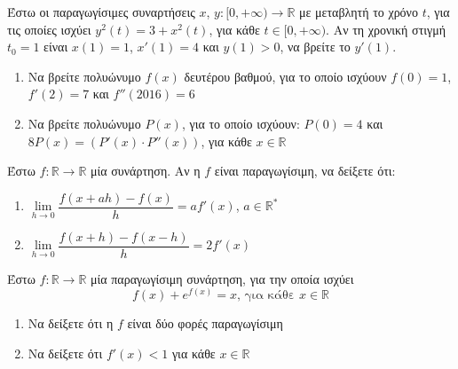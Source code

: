 \documentclass{presentation}
\begin{document}
\begin{askisi}
    Έστω οι παραγωγίσιμες συναρτήσεις $x$, $y:[0,+\infty)\to\mathbb{R}$ με μεταβλητή το χρόνο $t$, για τις οποίες ισχύει $y^2(t)=3+x^2(t)$, για κάθε $t\in [0,+\infty )$. Αν τη χρονική στιγμή $t_0=1$ είναι $x(1)=1$, $x'(1)=4$ και $y(1)>0$, να βρείτε το $y'(1)$.

\end{askisi}

\begin{askisi}
    \begin{enumerate}
        \item<1->  Να βρείτε πολυώνυμο $f(x)$ δευτέρου βαθμού, για το οποίο ισχύουν $f(0)=1$, $f'(2)=7$ και $f''(2016)=6$
        \item<2-> Να βρείτε πολυώνυμο $P(x)$, για το οποίο ισχύουν: $P(0)=4$ και $8P(x)=\left( P'(x)\cdot P''(x) \right) $, για κάθε $x\in\mathbb{R}$
    \end{enumerate}

\end{askisi}

\begin{askisi}
    Έστω $f:\mathbb{R}\to\mathbb{R}$ μία συνάρτηση. Αν η $f$ είναι παραγωγίσιμη, να δείξετε ότι:
    \begin{enumerate}
        \item<1-> $\lim\limits_{h \to 0}{ \dfrac{f(x+ah)-f(x)}{h} }=af'(x)$, $a\in\mathbb{R}^*$
        \item<2-> $\lim\limits_{h \to 0}{ \dfrac{f(x+h)-f(x-h)}{h} }=2f'(x)$
    \end{enumerate}

\end{askisi}

\begin{askisi}
    Έστω $f:\mathbb{R}\to\mathbb{R}$ μία παραγωγίσιμη συνάρτηση, για την οποία ισχύει
    $$f(x)+e^{f(x)}=x \text{, για κάθε } x\in\mathbb{R}$$
    \begin{enumerate}
        \item<1-> Να δείξετε ότι η $f$ είναι δύο φορές παραγωγίσιμη
        \item<2-> Να δείξετε ότι $f'(x)<1$ για κάθε $x\in\mathbb{R}$
    \end{enumerate}

\end{askisi}
\end{document}
